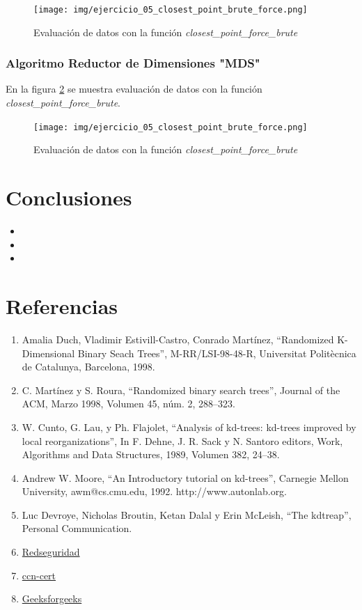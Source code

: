 \documentclass{article}
\begin{document}
\begin{figure}[h!]
	\centering
	\texttt{[image: img/ejercicio\_05\_closest\_point\_brute\_force.png]}
	\caption{Evaluación de datos con la función \textit{closest\_point\_force\_brute}}
	\label{fig:ejercicio_05_closest_point_brute_force}
\end{figure}

\clearpage
\subsubsection{Algoritmo Reductor de Dimensiones "MDS"}
En la figura \ref{fig:ejercicio_05_closest_point_brute_force} se muestra evaluación de datos con la función \textit{closest\_point\_force\_brute}.

\begin{figure}[h!]
	\centering
	\texttt{[image: img/ejercicio\_05\_closest\_point\_brute\_force.png]}
	\caption{Evaluación de datos con la función \textit{closest\_point\_force\_brute}}
	\label{fig:ejercicio_05_closest_point_brute_force}
\end{figure}

\clearpage
\section{Conclusiones}
\begin{itemize}
	\item 
	\item 
	\item 
\end{itemize}

\section{Referencias}
\begin{enumerate}
	\item Amalia Duch, Vladimir Estivill-Castro, Conrado Martínez, “Randomized K-Dimensional Binary Seach Trees”, M-RR/LSI-98-48-R, Universitat Politècnica de Catalunya, Barcelona, 1998.
	\item C. Martínez y S. Roura, “Randomized binary search trees”, Journal of the ACM, Marzo 1998, Volumen 45, núm. 2, 288$–$323.
	\item W. Cunto, G. Lau, y Ph. Flajolet, “Analysis of kd-trees: kd-trees improved by local reorganizations”, In F. Dehne, J. R. Sack y N. Santoro editors, Work, Algorithms and Data Structures, 1989, Volumen 382, 24$–$38.
	\item Andrew W. Moore, “An Introductory tutorial on kd-trees”, Carnegie Mellon University, awm@cs.cmu.edu, 1992. http://www.autonlab.org.
	\item Luc Devroye, Nicholas Broutin, Ketan Dalal y Erin McLeish, “The kdtreap”, Personal Communication.
	\item \href{https://www.redseguridad.com/revistas/red/095/58/index.html}{Redseguridad}
	\item \href{https://www.ccn-cert.cni.es/informes/informes-ccn-cert-publicos/5377-ccn-cert-ia-13-20-ciberamenazas-y-tendencias-edicion-2020/file.html}{ccn-cert}
	\item \href{https://www.geeksforgeeks.org/}{Geeksforgeeks}
\end{enumerate}
\end{document}

